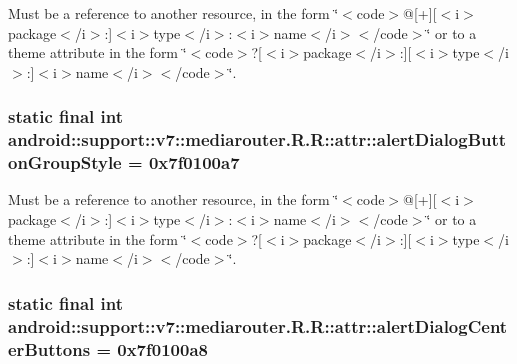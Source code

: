 Must be a reference to another resource, in the form \char`\"{}$<$code$>$@\mbox{[}+\mbox{]}\mbox{[}$<$i$>$package$<$/i$>$:\mbox{]}$<$i$>$type$<$/i$>$:$<$i$>$name$<$/i$>$$<$/code$>$\char`\"{} or to a theme attribute in the form \char`\"{}$<$code$>$?\mbox{[}$<$i$>$package$<$/i$>$:\mbox{]}\mbox{[}$<$i$>$type$<$/i$>$:\mbox{]}$<$i$>$name$<$/i$>$$<$/code$>$\char`\"{}. \hypertarget{classandroid_1_1support_1_1v7_1_1mediarouter_1_1_r_1_1attr_41f2cf5fa96ed705abefcf9581c52912}{
\subsubsection[{alertDialogButtonGroupStyle}]{\setlength{\rightskip}{0pt plus 5cm}static final int android::support::v7::mediarouter.R.R::attr::alertDialogButtonGroupStyle = 0x7f0100a7}}
\label{classandroid_1_1support_1_1v7_1_1mediarouter_1_1_r_1_1attr_41f2cf5fa96ed705abefcf9581c52912}


Must be a reference to another resource, in the form \char`\"{}$<$code$>$@\mbox{[}+\mbox{]}\mbox{[}$<$i$>$package$<$/i$>$:\mbox{]}$<$i$>$type$<$/i$>$:$<$i$>$name$<$/i$>$$<$/code$>$\char`\"{} or to a theme attribute in the form \char`\"{}$<$code$>$?\mbox{[}$<$i$>$package$<$/i$>$:\mbox{]}\mbox{[}$<$i$>$type$<$/i$>$:\mbox{]}$<$i$>$name$<$/i$>$$<$/code$>$\char`\"{}. \hypertarget{classandroid_1_1support_1_1v7_1_1mediarouter_1_1_r_1_1attr_471f9db31143ec9d217c0e070b72c31b}{
\subsubsection[{alertDialogCenterButtons}]{\setlength{\rightskip}{0pt plus 5cm}static final int android::support::v7::mediarouter.R.R::attr::alertDialogCenterButtons = 0x7f0100a8}}
\label{classandroid_1_1support_1_1v7_1_1mediarouter_1_1_r_1_1attr_471f9db31143ec9d217c0e070b72c31b}


